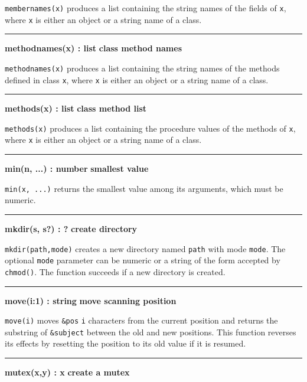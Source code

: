 \noindent
\texttt{membernames(x)} produces a list containing the string names of
the fields of \texttt{x}, where \texttt{x} is either an object or a
string name of a class.

\bigskip\hrule\vspace{0.1cm}
\noindent
{\bf methodnames(x) : list } \hfill {\bf class method names}

\noindent
\texttt{methodnames(x)} produces a list containing the string names of
the methods defined in class \texttt{x}, where \texttt{x} is either an
object or a string name of a class.

\bigskip\hrule\vspace{0.1cm}
\noindent
{\bf methods(x) : list } \hfill {\bf class method list}

\noindent
\texttt{methods(x)} produces a list containing the procedure values of
the methods of \texttt{x}, where \texttt{x} is either an object or a
string name of a class.

\bigskip\hrule\vspace{0.1cm}
\noindent
{\bf min(n, ...) : number } \hfill {\bf smallest value}

\noindent
{}\texttt{min(x, ...)} returns the smallest value among its
arguments, which must be numeric.

\bigskip\hrule\vspace{0.1cm}
\noindent
{\bf mkdir(s, s?) : ? } \hfill {\bf create directory}

\noindent
{}
\texttt{mkdir(path,mode)} creates a new directory named \texttt{path} with
mode \texttt{mode}. The optional \texttt{mode} parameter can be numeric or a
string of the form accepted by \texttt{chmod()}. The function succeeds
if a new directory is created.

\bigskip\hrule\vspace{0.1cm}
\noindent
{\bf move(i:1) : string } \hfill {\bf move scanning position}

\noindent
{}\texttt{move(i)} moves \texttt{\&pos} \texttt{i}
characters from the current position and returns the substring of
\texttt{\&subject} between the old and new positions. This function
reverses its effects by resetting the position to its old value if it
is resumed.

\bigskip\hrule\vspace{0.1cm}
\noindent
{\bf mutex(x,y) : x } \hfill {\bf create a mutex}

